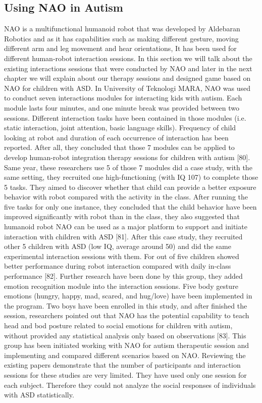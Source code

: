 \subsection{Using NAO in Autism}
NAO is a multifunctional humanoid robot that was developed by Aldebaran Robotics and as it has capabilities such as making different gesture, moving different arm and leg movement and hear orientations, It has been used for different human-robot interaction sessions. In this section we will talk about the existing interactions sessions that were conducted by NAO and later in the next chapter we will explain about our therapy sessions and designed game based on NAO for children with ASD.
In University of Teknologi MARA, NAO was used to conduct seven interactions modules for interacting kids with autism. Each module lasts four minutes, and one minute break was provided between two sessions. Different interaction tasks have been contained in those modules (i.e. static interaction, joint attention, basic language skills). Frequency of child looking at robot and duration of each occurrence of interaction has been reported. After all, they concluded that those 7 modules can be applied to develop human-robot integration therapy sessions for children with autism [80]. Same year, these researchers use 5 of those 7 modules did a case study, with the same setting, they recruited one high-functioning (with IQ 107) to complete those 5 tasks. They aimed to discover whether that child can provide a better exposure behavior with robot compared with the activity in the class. After running the five tasks for only one instance, they concluded that the child behavior have been improved significantly with robot than in the class, they also suggested that humanoid robot NAO can be used as a major platform to support and initiate interaction with children with ASD [81]. After this case study, they recruited other 5 children with ASD (low IQ, average around 50) and did the same experimental interaction sessions with them. For out of five children showed better performance during robot interaction compared with daily in-class performance [82]. Further research have been done by this group, they added emotion recognition module into the interaction sessions. Five body gesture emotions (hungry, happy, mad, scared, and hug/love) have been implemented in the program. Two boys have been enrolled in this study, and after finished the session, researchers pointed out that NAO has the potential capability to teach head and bod posture related to social emotions for children with autism, without provided any statistical analysis only based on observations [83]. This group has been initiated working with NAO for autism therapeutic session and implementing and compared different scenarios based on NAO. Reviewing the existing papers demonstrate that the number of participants and interaction sessions for these studies are very limited. They have used only one session for each subject. Therefore they could not analyze the social responses of individuals with ASD statistically.
